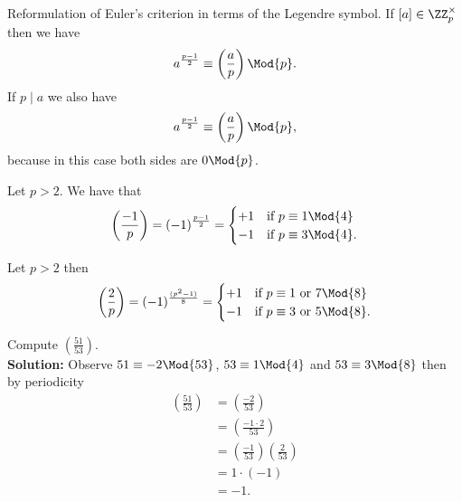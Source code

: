\documentclass[12pt, a4paper]{article}
\begin{document}
\begin{mdremark}
    Reformulation of Euler's criterion in terms of the Legendre symbol. If \([a]\in \ZZ_p^{\times}\) then we have 
    \[a^{\frac{p-1}{2}} \equiv \left( \frac{a}{p} \right) \Mod{p}.\]
    If \(p \mid a\) we also have 
    \[a^{\frac{p-1}{2}} \equiv \left( \frac{a}{p} \right) \Mod{p},\]
    because in this case both sides are \(0 \Mod{p}\).
\end{mdremark}

\begin{lemma}
    Let \(p>2\). We have that
    \[\begin{aligned}
        \left( \frac{-1}{p} \right) = (-1)^{\frac{p-1}{2}} =\begin{cases}
            +1 &\text{if } p\equiv 1 \Mod{4} \\
            -1 &\text{if } p\equiv 3 \Mod{4}.
        \end{cases}
    \end{aligned}\]
\end{lemma}

\begin{proposition}
    Let \(p>2\) then
    \[\begin{aligned}
        \left( \frac{2}{p} \right) =(-1)^{\frac{(p^2-1)}{8}} = \begin{cases}
            +1 &\text{if } p \equiv 1 \text{ or } 7 \Mod{8} \\
            -1 &\text{if } p \equiv 3 \text{ or } 5 \Mod{8}.
        \end{cases}
    \end{aligned}\]
\end{proposition}

\begin{mdexample}
    Compute \(\left( \frac{51}{53} \right)\). \\
    \textbf{Solution:} Observe \(51 \equiv -2 \Mod{53}\), \(53 \equiv 1 \Mod{4}\) and \(53 \equiv 3 \Mod{8}\) then by periodicity
    \[\begin{aligned}
        \left( \frac{51}{53} \right) &= \left( \frac{-2}{53} \right) \\
        &= \left( \frac{-1 \cdot 2}{53} \right) \\
        &= \left( \frac{-1}{53} \right)\left( \frac{2}{53} \right)\\
        &= 1 \cdot (-1) \\
        &= -1. 
    \end{aligned}\]
\end{mdexample}
\end{document}
